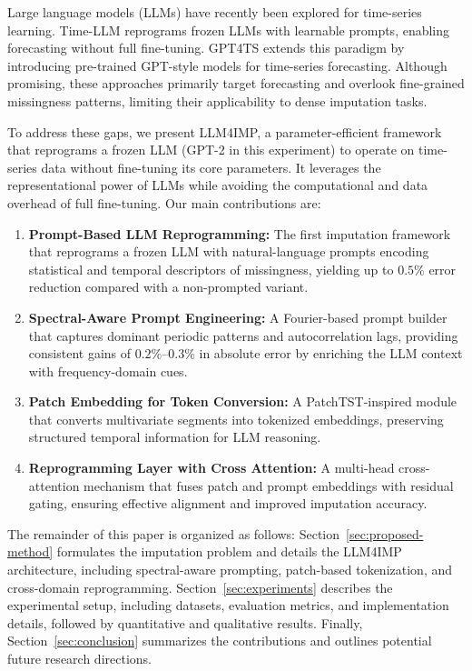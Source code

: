 \documentclass[conference]{IEEEtran}
\begin{document}
Large language models (LLMs) have recently been explored for time-series learning. Time-LLM \cite{TimeLLM} reprograms
frozen LLMs with learnable prompts, enabling forecasting without full fine-tuning. GPT4TS \cite{GPT4TS,messouspec2llm}
extends this paradigm by introducing pre-trained GPT-style models for time-series forecasting. Although promising, these
approaches primarily target forecasting and overlook fine-grained missingness patterns, limiting their applicability to dense imputation tasks.

To address these gaps, we present LLM4IMP, a parameter-efficient framework that reprograms a frozen LLM
(GPT-2 in this experiment) to operate on time-series data without fine-tuning its core parameters.
It leverages the representational power of LLMs while avoiding the computational and data overhead of full fine-tuning. Our main contributions are:
\begin{enumerate}
    \item \textbf{Prompt-Based LLM Reprogramming:} The first imputation framework that reprograms a frozen LLM with natural-language prompts encoding statistical and temporal descriptors of missingness, yielding up to $0.5\%$ error reduction compared with a non-prompted variant.
    \item \textbf{Spectral-Aware Prompt Engineering:} A Fourier-based prompt builder that captures dominant periodic patterns and autocorrelation lags, providing consistent gains of $0.2\%$--$0.3\%$ in absolute error by enriching the LLM context with frequency-domain cues.
    \item \textbf{Patch Embedding for Token Conversion:} A PatchTST-inspired module \cite{PatchTST} that converts multivariate segments into tokenized embeddings, preserving structured temporal information for LLM reasoning.
    \item \textbf{Reprogramming Layer with Cross Attention:} A multi-head cross-attention mechanism that fuses patch and prompt embeddings with residual gating, ensuring effective alignment and improved imputation accuracy.
\end{enumerate}
The remainder of this paper is organized as follows:
Section~\ref{sec:proposed-method} formulates the imputation problem and details the LLM4IMP architecture,
including spectral-aware prompting, patch-based tokenization, and cross-domain reprogramming.
Section~\ref{sec:experiments} describes the experimental setup, including datasets, evaluation metrics, and implementation details,
followed by quantitative and qualitative results.
Finally, Section~\ref{sec:conclusion} summarizes the contributions and outlines potential future research directions.
\end{document}
